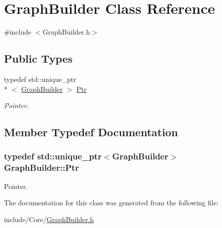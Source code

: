 \hypertarget{class_graph_builder}{\section{Graph\-Builder Class Reference}
\label{class_graph_builder}
}


{\ttfamily \#include $<$Graph\-Builder.\-h$>$}

\subsection*{Public Types}
\begin{DoxyCompactItemize}
\item 
typedef std\-::unique\-\_\-ptr\\*
$<$ \hyperlink{class_graph_builder}{Graph\-Builder} $>$ \hyperlink{class_graph_builder_a2bce26be1d5bfac38d3f69f4bf79217b}{Ptr}
\begin{DoxyCompactList}\small\item\em Pointer. \end{DoxyCompactList}\end{DoxyCompactItemize}


\subsection{Member Typedef Documentation}
\hypertarget{class_graph_builder_a2bce26be1d5bfac38d3f69f4bf79217b}{
\subsubsection[{Ptr}]{\setlength{\rightskip}{0pt plus 5cm}typedef std\-::unique\-\_\-ptr$<${\bf Graph\-Builder}$>$ {\bf Graph\-Builder\-::\-Ptr}}}\label{class_graph_builder_a2bce26be1d5bfac38d3f69f4bf79217b}


Pointer. 



The documentation for this class was generated from the following file\-:\begin{DoxyCompactItemize}
\item 
include/\-Core/\hyperlink{_graph_builder_8h}{Graph\-Builder.\-h}\end{DoxyCompactItemize}
